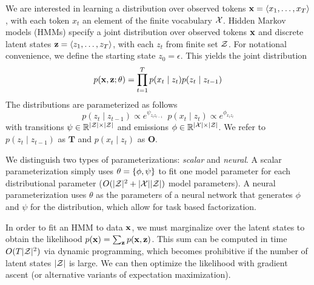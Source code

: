 \documentclass[11pt,a4paper]{article}
\begin{document}
We are interested in learning a distribution over observed tokens
$\mathbf{x} = \langle x_1, \ldots, x_T \rangle$, with each token $x_t$
an element of the finite vocabulary $\mathcal{X}$.
Hidden Markov models (HMMs) specify a joint distribution over 
observed tokens $\mathbf{x}$ and discrete latent states $\mathbf{z} = \langle z_1, \ldots, z_T \rangle$,
with each $z_t$ from finite set $\mathcal{Z}$.
For notational convenience, we define the starting state $z_0=\epsilon$.
This yields the joint distribution
\begin{equation}
p(\mathbf{x}, \mathbf{z}; \theta)
= \prod_{t=1}^T p(x_t\mid z_t)p(z_t \mid z_{t-1})
\end{equation}
\noindent The distributions are parameterized as follows
\begin{equation}
\label{param}
 p(z_t \mid z_{t-1}) \propto e^{\psi_{z_tz_{t-1}}} \; \ p(x_t \mid z_t) \propto e^{\phi_{x_tz_t}}
\end{equation}
with  transitions $\psi \in \mathbb{R}^{|\mathcal{Z}|\times|\mathcal{Z}|}$
and  emissions $\phi \in \mathbb{R}^{|\mathcal{X}| \times |\mathcal{Z}|}$.
We refer to 
$p(z_t \mid z_{t-1})$ as $\mathbf{T}$ and $p(x_t \mid z_t)$ as $\mathbf{O}$.

We distinguish two types of parameterizations: \textit{scalar} and \textit{neural}.
A scalar parameterization simply uses $\theta = \left\{\phi,\psi\right\}$ to fit one model parameter for
each distributional parameter ($O(|\mathcal{Z}|^2 + |\mathcal{X}||\mathcal{Z}|)$ model parameters). A neural parameterization uses $\theta$ as the parameters of a neural network
that generates $\phi$ and $\psi$ for the distribution, which allow for task based factorization. 

In order to fit an HMM to data $\mathbf{x}$,
we must marginalize over the latent states to obtain the likelihood
$p(\mathbf{x}) = \sum_{\mathbf{z}}p(\mathbf{x},\mathbf{z})$.
This sum can be computed in time $O(T|\mathcal{Z}|^2)$ via dynamic programming,
which becomes prohibitive if the number of latent states $|\mathcal{Z}|$ is large.
We can then optimize the likelihood 
with gradient ascent (or alternative variants of expectation maximization).
\end{document}
